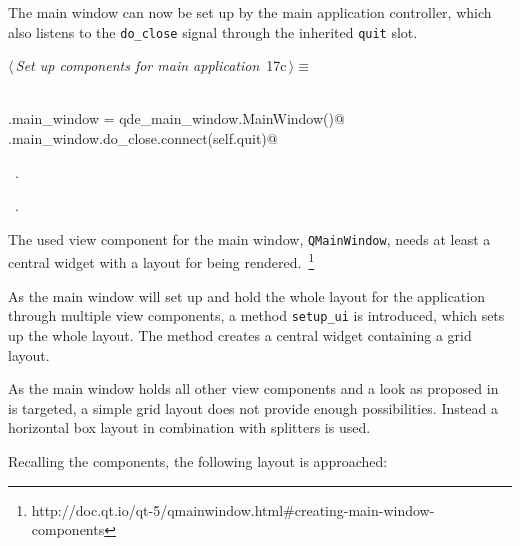 \documentclass[
    a4paper,      %
    10pt,         %
    openright,    %
    notitlepage,  %
    parskip=half, %
]{scrreprt}       %
\theoremstyle{definition}                    %
\begin{document}
The main window can now be set up by the main application controller, which also
listens to the \verb=do_close= signal through the inherited \verb=quit= slot.

\begin{flushleft} \small
\begin{minipage}{\linewidth}\label{scrap8}\raggedright\small
{} $\langle\,${\itshape Set up components for main application}\nobreak\ {\footnotesize {17c}}$\,\rangle\equiv$
\vspace{-1ex}
\begin{list}{}{} \item
\mbox{}\lstinline@@\\
\mbox{}\lstinline@self.main_window = qde_main_window.MainWindow()@\\
\mbox{}\lstinline@self.main_window.do_close.connect(self.quit)@\\
\mbox{}\lstinline@@{\NWsep}
\end{list}
\vspace{-1.5ex}
\footnotesize
\begin{list}{}{\setlength{\itemsep}{-\parsep}\setlength{\itemindent}{-\leftmargin}}
\item \NWtxtMacroDefBy\ .
\item \NWtxtMacroRefIn\ .

\item{}
\end{list}
\end{minipage}\vspace{4ex}
\end{flushleft}
The used view component for the main window, \verb+QMainWindow+, needs at least
a central widget with a layout for being
rendered.~\footnote{http://doc.qt.io/qt-5/qmainwindow.html\#creating-main-window-components}

As the main window will set up and hold the whole layout for the application
through multiple view components, a method \verb+setup_ui+ is introduced, which
sets up the whole layout. The method creates a central widget containing a grid
layout.

As the main window holds all other view components and a look as proposed
in~ is targeted, a simple grid layout does
not provide enough possibilities. Instead a horizontal box layout in combination
with splitters is used.

Recalling the components, the following layout is approached:
\end{document}

